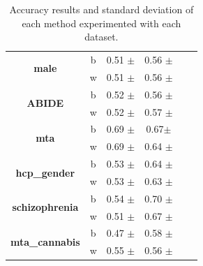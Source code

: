 \begin{table}
{\begin{tabular}{c|c|c|c|l|l}
		\bottomrule
		\multirow{2}{*}{\textbf{male}}                                               & b                      & 0.51 $\pm$     & 0.56 $\pm$ & \multicolumn{1}{c|}{}                    & \multicolumn{1}{c}{}                     \\ 
		\cline{2-6}
		& \multicolumn{1}{l|}{w} & 0.51 $\pm$     & 0.56 $\pm$ &                                          &                                          \\ 
		\bottomrule
		\multirow{2}{*}{\textbf{ABIDE}}                                              & b                      & 0.52 $\pm$     & 0.56 $\pm$& \multicolumn{1}{c|}{}                    & \multicolumn{1}{c}{}                     \\ 
		\cline{2-6}
		& \multicolumn{1}{l|}{w} & 0.52 $\pm$    & 0.57 $\pm$&                                          &                                          \\ 
		\bottomrule
		\multirow{2}{*}{\textbf{mta}}                                                & b                      & 0.69 $\pm$      & 0.67$\pm$ & \multicolumn{1}{c|}{}                    & \multicolumn{1}{c}{}                     \\ 
		\cline{2-6}
		& \multicolumn{1}{l|}{w} & 0.69 $\pm$     & 0.64 $\pm$ &                                          &                                          \\ 
		\bottomrule
		\multirow{2}{*}{\textbf{hcp\_gender}}                                        & b                      & 0.53 $\pm$      & 0.64 $\pm$ & \multicolumn{1}{c|}{}                    & \multicolumn{1}{c}{}                     \\ 
		\cline{2-6}
		& \multicolumn{1}{l|}{w} & 0.53 $\pm$      & 0.63 $\pm$ &                                          &                                          \\ 
		\bottomrule
		\multirow{2}{*}{\textbf{schizophrenia}}                                      & b                     & 0.54 $\pm$     & 0.70 $\pm$ & \multicolumn{1}{c|}{}                    & \multicolumn{1}{c}{}         \\ 
		\cline{2-6}
		& \multicolumn{1}{l|}{w} & 0.51 $\pm$      & 0.67 $\pm$ &                                          &                                          \\ 
		\bottomrule
		\multicolumn{1}{l|}{\multirow{2}{*}{\textbf{mta\_cannabis}}} & b                      & 0.47 $\pm$      & 0.58 $\pm$ &                                          &                                          \\ 
		\cline{3-6}
		\multicolumn{1}{l|}{}                                                        & w                      & 0.55 $\pm$      & 0.56 $\pm$ &                                          &                                          \\
		\hline
	\end{tabular}
}
\caption{Accuracy results and standard deviation of each method experimented with each dataset.}
\label{tab:all_results}
\end{table}

